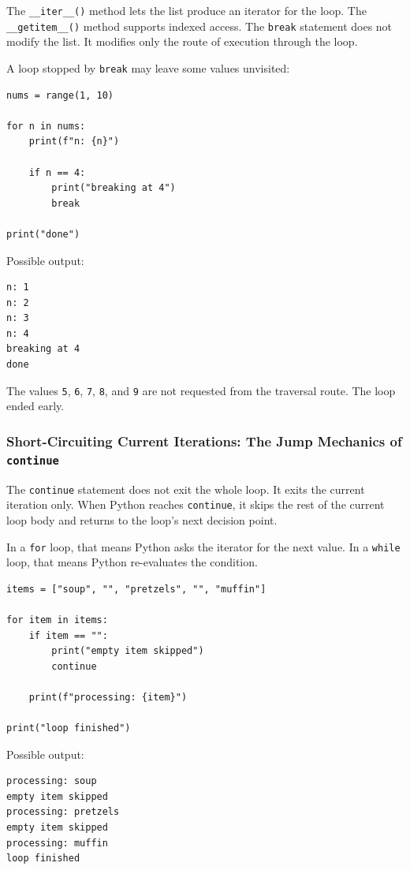 The \texttt{\_\_iter\_\_()} method lets the list produce an iterator for the loop. The \texttt{\_\_getitem\_\_()} method supports indexed access. The \texttt{break} statement does not modify the list. It modifies only the route of execution through the loop.

A loop stopped by \texttt{break} may leave some values unvisited:

\begin{verbatim}
nums = range(1, 10)

for n in nums:
    print(f"n: {n}")

    if n == 4:
        print("breaking at 4")
        break

print("done")
\end{verbatim}

Possible output:

\begin{verbatim}
n: 1
n: 2
n: 3
n: 4
breaking at 4
done
\end{verbatim}

The values \texttt{5}, \texttt{6}, \texttt{7}, \texttt{8}, and \texttt{9} are not requested from the traversal route. The loop ended early.

\subsubsection{Short-Circuiting Current Iterations: The Jump Mechanics of \texttt{continue}}

The \texttt{continue} statement does not exit the whole loop. It exits the current iteration only. When Python reaches \texttt{continue}, it skips the rest of the current loop body and returns to the loop's next decision point.

In a \texttt{for} loop, that means Python asks the iterator for the next value. In a \texttt{while} loop, that means Python re-evaluates the condition.

\begin{verbatim}
items = ["soup", "", "pretzels", "", "muffin"]

for item in items:
    if item == "":
        print("empty item skipped")
        continue

    print(f"processing: {item}")

print("loop finished")
\end{verbatim}

Possible output:

\begin{verbatim}
processing: soup
empty item skipped
processing: pretzels
empty item skipped
processing: muffin
loop finished
\end{verbatim}

